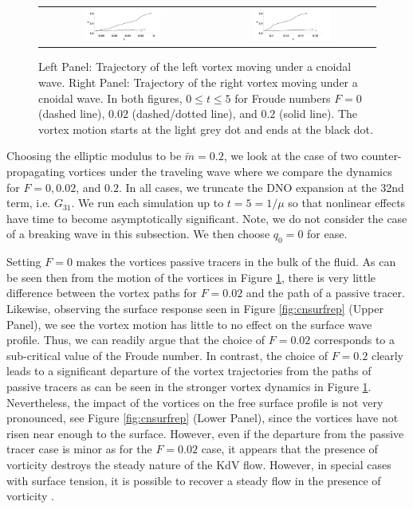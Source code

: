 \documentclass[a4paper,11pt]{article}
\begin{document}
\begin{figure}[!h]
\centering
\begin{tabular}{cc}
\includegraphics[width=0.48\textwidth]{leftside_cnoid_tracks} & 
\includegraphics[width=0.48\textwidth]{rightside_cnoid_tracks}
\end{tabular}
\caption{\small Left Panel: Trajectory of the left vortex moving under a cnoidal wave.  Right Panel: Trajectory of the right vortex moving under a cnoidal wave.  In both figures, $0\leq t \leq 5$ for Froude numbers $F=0$ (dashed line), $0.02$ (dashed/dotted line), and $0.2$ (solid line).  The vortex motion starts at the light grey dot and ends at the black dot.}
\label{fig:cntrack}
\end{figure}



Choosing the elliptic modulus to be $\tilde{m}=0.2$, we look at the case of two counter-propagating vortices under the traveling wave where we compare the dynamics for $F=0, 0.02$, and $0.2$.  In all cases, we truncate the DNO expansion at the 32nd term, i.e. $G_{31}$.  We run each simulation up to $t=5=1/\mu$ so that nonlinear effects have time to become asymptotically significant.  Note, we do not consider the case of a breaking wave in this subsection.  We then choose $q_{0}=0$ for ease.        

Setting $F=0$ makes the vortices passive tracers in the bulk of the fluid. As can be seen then from the motion of the vortices in Figure \ref{fig:cntrack}, there is very little difference between the vortex paths for $F=0.02$ and the path of a passive tracer.  Likewise, observing the surface response seen in Figure \ref{fig:cnsurfrep} (Upper Panel), we see the vortex motion has little to no effect on the surface wave profile.  Thus, we can readily argue that the choice of $F=0.02$ corresponds to a sub-critical value of the Froude number.  In contrast, the choice of $F=0.2$ clearly leads to a significant departure of the vortex trajectories from the paths of passive tracers as can be seen in the stronger vortex dynamics in Figure \ref{fig:cntrack}.  Nevertheless, the impact of the vortices on the free surface profile is not very pronounced, see Figure \ref{fig:cnsurfrep} (Lower Panel), since the vortices have not risen near enough to the surface.  However, even if the departure from the passive tracer case is minor as for the $F=0.02$ case, it appears that the presence of vorticity destroys the steady nature of the KdV flow.  However, in special cases with surface tension, it is possible to recover a steady flow in the presence of vorticity \cite{walsh}.  
\end{document}
